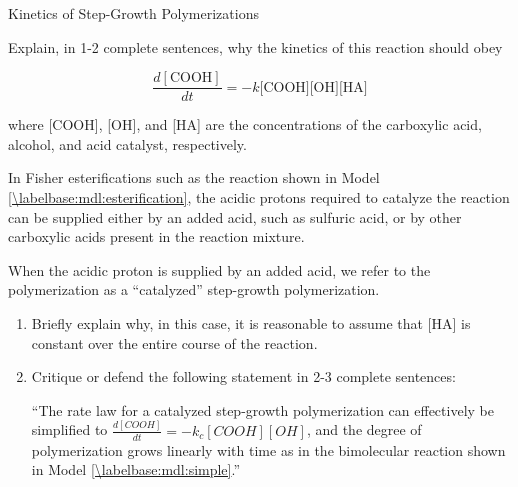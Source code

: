 \begin{activity}{Kinetics of Step-Growth Polymerizations}
\begin{ctqs}
			\begin{solution}[0.5in]
			\end{solution}
		
		\question Explain, in 1-2 complete sentences, why the kinetics of this reaction should obey
		
			\begin{equation*}
				\frac{d[\text{COOH}]}{dt} = - k \text{[COOH][OH][HA]}
			\end{equation*}
			
			where [COOH], [OH], and [HA] are the concentrations of the carboxylic acid, alcohol, and acid catalyst, respectively.\label{\labelbase:ctq:fisherratelaw}
			
				\begin{solution}[2.5in]
				\end{solution}
		
\end{ctqs}

\begin{infobox}
	In Fisher esterifications such as the reaction shown in Model \ref{\labelbase:mdl:esterification}, the acidic protons required to catalyze the reaction can be supplied either by an added acid, such as sulfuric acid, or by other carboxylic acids present in the reaction mixture.
\end{infobox}

\begin{ctqs}
	
	\question When the acidic proton is supplied by an added acid, we refer to the polymerization as a ``catalyzed'' step-growth polymerization.
	
		\begin{enumerate}
			\item Briefly explain why, in this case, it is reasonable to assume that [HA] is constant over the entire course of the reaction.
			
				\begin{solution}[1.5in]
				\end{solution}
			
			\clearpage
			\item Critique or defend the following statement in 2-3 complete sentences:
			
				``The rate law for a catalyzed step-growth polymerization can effectively be simplified to $\frac{d[COOH]}{dt} = - k_c [COOH][OH]$, and the degree of polymerization grows linearly with time as in the bimolecular reaction shown in Model \ref{\labelbase:mdl:simple}.''
			

\end{enumerate}
\end{ctqs}
\end{activity}

